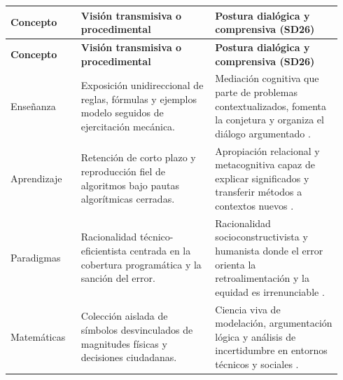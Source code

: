\documentclass[spanish,letterpaper,oneside]{article}
\begin{document}
{\small{}\renewcommand{\arraystretch}{1.35}
\begin{longtable}{|>{\raggedright\arraybackslash}p{0.20\linewidth}|>{\raggedright\arraybackslash}p{0.38\linewidth}|>{\raggedright\arraybackslash}p{0.36\linewidth}|}\hline
\rowcolor{iiiepePale} \textbf{Concepto} & \textbf{Visión transmisiva o procedimental} & \textbf{Postura dialógica y comprensiva (SD26)} \\\hline
\endfirsthead
\hline
\rowcolor{iiiepePale} \textbf{Concepto} & \textbf{Visión transmisiva o procedimental} & \textbf{Postura dialógica y comprensiva (SD26)} \\\hline
\endhead
Enseñanza & Exposición unidireccional de reglas, fórmulas y ejemplos modelo seguidos de ejercitación mecánica. & Mediación cognitiva que parte de problemas contextualizados, fomenta la conjetura y organiza el diálogo argumentado \citep{sawyer2008optimizing}. \\\hline
Aprendizaje & Retención de corto plazo y reproducción fiel de algoritmos bajo pautas algorítmicas cerradas. & Apropiación relacional y metacognitiva capaz de explicar significados y transferir métodos a contextos nuevos \citep{scott2015futuro}. \\\hline
Paradigmas & Racionalidad técnico-eficientista centrada en la cobertura programática y la sanción del error. & Racionalidad socioconstructivista y humanista donde el error orienta la retroalimentación y la equidad es irrenunciable \citep{unesco2015replantear}. \\\hline
Matemáticas & Colección aislada de símbolos desvinculados de magnitudes físicas y decisiones ciudadanas. & Ciencia viva de modelación, argumentación lógica y análisis de incertidumbre en entornos técnicos y sociales \citep{sep2023pensamiento}. \\\hline
\end{longtable}}
\end{document}
